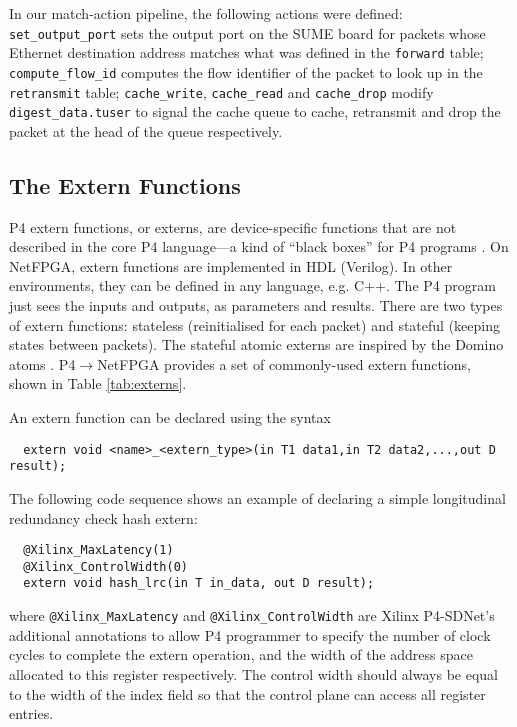 In our match-action pipeline, the following actions were defined: \texttt{set\_output\_port} sets the output port on the SUME board for packets whose Ethernet destination address matches what was defined in the \verb|forward| table; \texttt{compute\_flow\_id} computes the flow identifier of the packet to look up in the \verb|retransmit| table; \texttt{cache\_write}, \texttt{cache\_read} and \texttt{cache\_drop} modify \texttt{digest\_data.tuser} to signal the cache queue to cache, retransmit and drop the packet at the head of the queue respectively.

	\subsection{The Extern Functions}
	\label{sec:extern}
P4 extern functions, or externs, are device-specific functions that are not described in the core P4 language---a kind of ``black boxes'' for P4 programs \cite{ibanez}. On NetFPGA, extern functions are implemented in HDL (Verilog). In other environments, they can be defined in any language, e.g. C++. The P4 program just sees the inputs and outputs, as parameters and results. There are two types of extern functions: stateless (reinitialised for each packet) and stateful (keeping states between packets). The stateful atomic externs are inspired by the Domino atoms \cite{domino}. P4$\rightarrow$NetFPGA provides a set of commonly-used extern functions, shown in Table \ref{tab:externs}. 

An extern function can be declared using the syntax

{\renewcommand{\baselinestretch}{0.8}\small
	\centering
	\begin{verbatim}
  extern void <name>_<extern_type>(in T1 data1,in T2 data2,...,out D result);
	\end{verbatim}
} 

The following code sequence shows an example of declaring a simple longitudinal redundancy check hash extern:

{\renewcommand{\baselinestretch}{0.8}\small
	\begin{verbatim}
  @Xilinx_MaxLatency(1)
  @Xilinx_ControlWidth(0)
  extern void hash_lrc(in T in_data, out D result);
	\end{verbatim}
}
where \texttt{@Xilinx\_MaxLatency} and \texttt{@Xilinx\_ControlWidth} are Xilinx P4-SDNet's additional annotations to allow P4 programmer to specify the number of clock cycles to complete the extern operation, and the width of the address space allocated to this register respectively. The control width should always be equal to the width of the index field so that the control plane can access all register entries.

